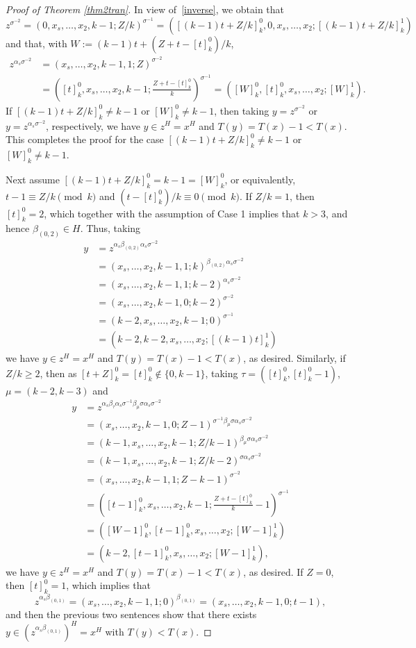 \documentclass[11pt,a4paper,reqno]{amsart}
\theoremstyle{definition}
\begin{document}
\begin{proof}[Proof of Theorem \ref{thm2tran}]
In view of~\eqref{inverse}, we obtain that
\[
  z^{\sigma^{-2}}=(0,x_s,\ldots,x_2,k-1;Z/k)^{\sigma^{-1}}=([(k-1)t+Z/k]_k^0,0,x_s,\ldots,x_2;[(k-1)t+Z/k]_k^1)
\]
and that, with $W:=(k-1)t+(Z+t-[t]_k^0)/k$,
\begin{align*}
  z^{\alpha_s\sigma^{-2}}&=(x_s,\ldots,x_2,k-1,1;Z)^{\sigma^{-2}}\\
  &=\left([t]_k^0,x_s,\ldots,x_2,k-1;\frac{Z+t-[t]_k^0}{k}\right)^{\sigma^{-1}}=\left([W]_k^0,[t]_k^0,x_s,\ldots,x_2;[W]_k^1\right).
\end{align*}
If  $[(k-1)t+Z/k]_k^0\neq k-1$ or $[W]_k^0\neq k-1$, then taking $y=z^{\sigma^{-2}}$ or $y=z^{\alpha_s\sigma^{-2}}$, respectively, we have $y\in z^H=x^H$ and $T(y)=T(x)-1<T(x)$. This completes the proof for the case $[(k-1)t+Z/k]_k^0\neq k-1$ or $[W]_k^0\neq k-1$.

Next assume $[(k-1)t+Z/k]_k^0= k-1=[W]_k^0$, or equivalently, $t-1\equiv Z/k\pmod{k}$ and $(t-[t]_k^0)/k \equiv 0\pmod{k}$.
If $Z/k=1$, then $[t]_k^0=2$, which together with the assumption of Case 1 implies that $k>3$, and hence $\beta_{(0,2)}\in H$. Thus, taking
\begin{align*}
  y&=z^{\alpha_s\beta_{(0,2)}\alpha_s\sigma^{-2}}\\
  &=(x_s,\ldots,x_2,k-1,1;k)^{\beta_{(0,2)}\alpha_s\sigma^{-2}}\\
  &=(x_s,\ldots,x_2,k-1,1;k-2)^{\alpha_s\sigma^{-2}}\\
  &=(x_s,\ldots,x_2,k-1,0;k-2)^{\sigma^{-2}}\\
  &=(k-2,x_s,\ldots,x_2,k-1;0)^{\sigma^{-1}}\\
  &=(k-2,k-2,x_s,\ldots,x_2; [(k-1)t]_k^1)
\end{align*}
we have $y\in z^H=x^H$ and $T(y)=T(x)-1<T(x)$, as desired.
Similarly, if $Z/k\geq 2$, then as $[t+Z]_k^0=[t]_k^0\notin\{0,k-1\}$, taking $\tau=([t]_k^0, [t]_k^0-1)$, $\mu=(k-2 , k-3)$ and
\begin{align*}
 y&=z^{\alpha_s\beta_{\tau}\alpha_s\sigma^{-1}\beta_{\mu}\sigma\alpha_s\sigma^{-2}}\\
  &=(x_s,\ldots,x_2,k-1,0;Z-1)^{\sigma^{-1}\beta_{\mu}\sigma\alpha_s\sigma^{-2}}\\
  &=(k-1,x_s,\ldots,x_2,k-1;Z/k-1)^{\beta_{\mu}\sigma\alpha_s\sigma^{-2}}\\
  &=(k-1,x_s,\ldots,x_2,k-1;Z/k-2)^{\sigma\alpha_s\sigma^{-2}}\\
  &=(x_s,\ldots,x_2,k-1,1;Z-k-1)^{\sigma^{-2}}\\
  &=\left([t-1]_k^0, x_s,\ldots,x_2,k-1;\frac{Z+t-[t]_k^0}{k}-1\right)^{\sigma^{-1}}\\
  &=([W-1]_k^0,[t-1]_k^0, x_s,\ldots,x_2;[W-1]_k^1)\\
  &=(k-2,[t-1]_k^0, x_s,\ldots,x_2;[W-1]_k^1),
\end{align*}
we have $y\in z^H=x^H$ and $T(y)=T(x)-1<T(x)$, as desired. If $Z=0$, then $[t]_k^0=1$, which implies that
\begin{equation*}
  z^{\alpha_s\beta_{(0,1)}}=(x_s,\ldots,x_2,k-1,1;0)^{\beta_{(0,1)}}=(x_s,\ldots,x_2,k-1,0;t-1),
\end{equation*}
and then the previous two sentences show that there exists $y\in(z^{\alpha_s\beta_{(0,1)}})^H=x^H$ with $T(y)<T(x)$.


\end{proof}
\end{document}
